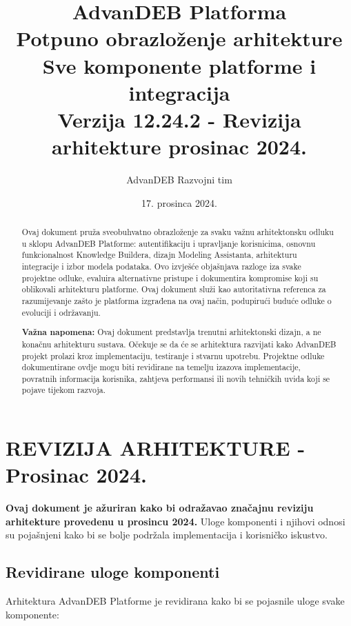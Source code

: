 \documentclass[12pt,a4paper]{article}
\title{
    \textbf{\Huge \textcolor{titlecolor}{AdvanDEB Platforma}}\\
    \vspace{0.5cm}
    \Large Potpuno obrazloženje arhitekture\\
    \large Sve komponente platforme i integracija\\
    \vspace{0.3cm}
    \normalsize Verzija 12.24.2 - Revizija arhitekture prosinac 2024.
}
\author{AdvanDEB Razvojni tim}
\date{17. prosinca 2024.}
\begin{document}
\maketitle
\thispagestyle{empty}

\vspace{2cm}

\begin{abstract}
Ovaj dokument pruža sveobuhvatno obrazloženje za svaku važnu arhitektonsku odluku u sklopu AdvanDEB Platforme: autentifikaciju i upravljanje korisnicima, osnovnu funkcionalnost Knowledge Buildera, dizajn Modeling Assistanta, arhitekturu integracije i izbor modela podataka. Ovo izvješće objašnjava razloge iza svake projektne odluke, evaluira alternativne pristupe i dokumentira kompromise koji su oblikovali arhitekturu platforme. Ovaj dokument služi kao autoritativna referenca za razumijevanje zašto je platforma izgrađena na ovaj način, podupirući buduće odluke o evoluciji i održavanju.

\textbf{Važna napomena:} Ovaj dokument predstavlja trenutni arhitektonski dizajn, a ne konačnu arhitekturu sustava. Očekuje se da će se arhitektura razvijati kako AdvanDEB projekt prolazi kroz implementaciju, testiranje i stvarnu upotrebu. Projektne odluke dokumentirane ovdje mogu biti revidirane na temelju izazova implementacije, povratnih informacija korisnika, zahtjeva performansi ili novih tehničkih uvida koji se pojave tijekom razvoja.
\end{abstract}

\newpage
\tableofcontents
\newpage

\section{REVIZIJA ARHITEKTURE - Prosinac 2024.}

\begin{tcolorbox}[colback=red!5!white,colframe=red!75!black,title=\textbf{Važno: Model arhitekture ažuriran}]
\textbf{Ovaj dokument je ažuriran kako bi odražavao značajnu reviziju arhitekture provedenu u prosincu 2024.} Uloge komponenti i njihovi odnosi su pojašnjeni kako bi se bolje podržala implementacija i korisničko iskustvo.
\end{tcolorbox}

\subsection{Revidirane uloge komponenti}

Arhitektura AdvanDEB Platforme je revidirana kako bi se pojasnile uloge svake komponente:
\end{document}
